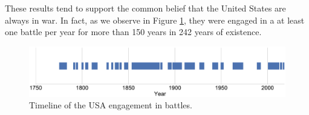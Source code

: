  These results tend to support the common belief that the United States are always in war. In fact, as we observe in Figure \ref{fig:USAFightingTimeline}, they were engaged in a at least one battle per year for more than 150 years in 242 years of existence.
 \begin{figure}[h]
 	\centering	\includegraphics[width=\linewidth]{figures/USAFighting}
 	\caption{Timeline of the USA engagement in battles.}\label{fig:USAFightingTimeline}
 	\centering
 \end{figure}

